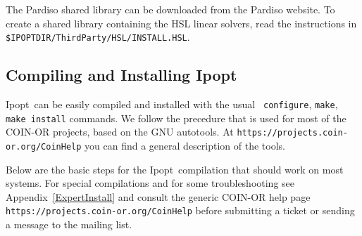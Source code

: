 \documentclass[10pt]{article}
\newcommand{\Ipopt}{{\sc Ipopt}}
\begin{document}
The Pardiso shared library can be downloaded from the Pardiso website.
To create a shared library containing the HSL linear solvers, read the
instructions in \texttt{\$IPOPTDIR/ThirdParty/HSL/INSTALL.HSL}.

\subsection{Compiling and Installing \Ipopt} \label{sec.comp_and_inst}

\Ipopt\ can be easily compiled and installed with the usual {\tt
  configure}, {\tt make}, {\tt make install} commands.  We follow the
precedure that is used for most of the COIN-OR projects, based on the
GNU autotools.  At \texttt{https://projects.coin-or.org/CoinHelp}
you can find a general description of the tools.

Below are the basic steps for the \Ipopt\ compilation that should work
on most systems.  For special compilations and for some
troubleshooting see Appendix~\ref{ExpertInstall} and consult the
generic COIN-OR help page
\texttt{https://projects.coin-or.org/CoinHelp} before submitting a
ticket or sending a message to the mailing list.
\end{document}
